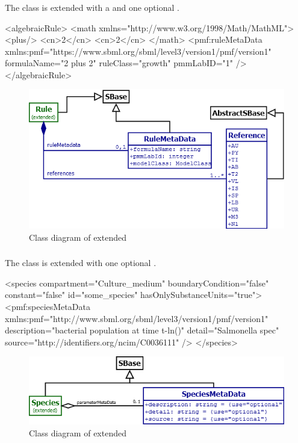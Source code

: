 \subsubsection{}
The \Rule class is extended with a \ListOfReferences and one optional
\RuleMetaData.
\begin{example}
<algebraicRule>
  <math xmlns="http://www.w3.org/1998/Math/MathML">
    <plus/>
    <cn>2</cn>
    <cn>2</cn>
  </math>
  <pmf:ruleMetaData xmlns:pmf="https://www.sbml.org/sbml/level3/version1/pmf/version1"
    formulaName="2 plus 2" ruleClass="growth" pmmLabID="1" />
</algebraicRule>
\end{example}

\begin{figure}
	\includegraphics[scale=0.7]{img/rule_uml}
	\caption{Class diagram of extended \Rule}
	\label{rule_uml}
\end{figure}

\subsubsection{}
The \Species class is extended with one optional \SpeciesMetaData.
\begin{example}
<species compartment="Culture_medium" boundaryCondition="false" constant="false"
  id="some_species" hasOnlySubstanceUnits="true">
  <pmf:speciesMetaData xmlns:pmf="http://www.sbml.org/sbml/level3/version1/pmf/version1"
    description="bacterial population at time t-ln()" detail="Salmonella spec"
    source="http://identifiers.org/ncim/C0036111" />
</species>
\end{example}

\begin{figure}
	\includegraphics[scale=0.7]{img/species_uml}
	\caption{Class diagram of extended \Species}
	\label{species_uml}
\end{figure}

